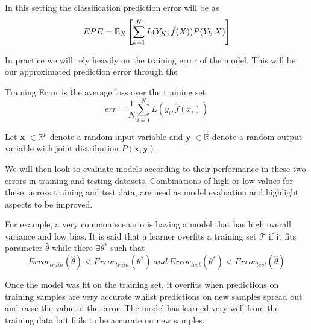 
In this setting the classification prediction error will be as
\begin{equation}\label{classificationEPE}
EPE = \operatorname{\mathbb{E}}_X\left[ \sum_{k=1}^{K} L( Y_K , \hat{f}(X) ) P(Y_k|X) \right]
\end{equation}


In practice we will rely heavily on the training error of the model. This will be our approximated prediction error through the
\begin{definition}{Training Error}
is the average loss over the training set
$$ \overline{err} = \frac{1}{N} \sum_{i=1}^N L(y_i, \hat{f}(x_i) )$$
\end{definition}


Let \textbf{x} $\in \mathbb{R}^{p}$ denote a random input variable and \textbf{y}  $\in \mathbb{R}$ denote a random output variable with joint distribution $P\left(\textbf{x},\textbf{y}\right)$.


We will then look to evaluate models according to their performance in these two errors in training and testing datasets. Combinations of high or low values for these, across training and test data, are used as model evaluation and highlight aspects to be improved.

For example, a very common scenario is having a model that has high overall variance and low bias.
It is said that a learner overfits a training set $\mathcal{T}$ if it fits parameter $\hat{\theta}$ while there $\exists \theta^*$ such that
\begin{equation} \label{eq:overfitting}
Error_{train}(\hat{\theta}) < Error_{train}(\theta^*) \  and \ Error_{test}(\theta^*) < Error_{test}(\hat{\theta})
\end{equation}

Once the model was fit on the training set, it overfits when predictions on training samples are very accurate whilst predictions on new samples spread out and raise the value of the error. The model has learned very well from the training data but fails to be accurate on new samples.

